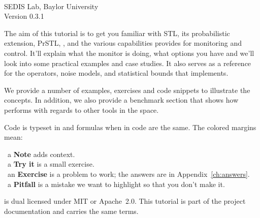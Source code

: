 \thispagestyle{empty}

\vspace*{6.4cm}

\vfill
{}\\[2pt]
{\sffamily\color{faint} SEDIS Lab, Baylor University}\\[10pt]
{\sffamily\color{faint} Version 0.3.1}

\clearpage
\thispagestyle{empty}
\noindent\rule{0pt}{1pt}
\vfill
{}

\medskip
\noindent The aim of this tutorial is to get you familiar with STL, its probabilistic extension, PrSTL, \sentil{}, and the various capabilities \sentil{} provides for monitoring and control. It'll explain what the monitor is doing, what options you have and we'll look into some practical examples and case studies. It also serves as a reference for the operators, noise models, and statistical bounds that \sentil{} implements.

\medskip
\noindent We provide a number of examples, exercises and code snippets to illustrate the concepts. In addition, we also provide a benchmark section that shows how \sentil{} performs with regards to other tools in the space.

\medskip
{}

\medskip
\noindent Code is typeset in  and formulas when in code are the same. The colored margins mean:

\smallskip
\noindent{\color{sentilblue}\rule{2.2pt}{9pt}}~a \textbf{Note} adds context.\\
\noindent{\color{trygreen}\rule{2.2pt}{9pt}}~a \textbf{Try it} is a small exercise.\\
\noindent{\color{okpurple}\rule{2.2pt}{9pt}}~an \textbf{Exercise} is a problem to work; the answers are in Appendix~\ref{ch:answers}.\\
\noindent{\color{vermillion}\rule{2.2pt}{9pt}}~a \textbf{Pitfall} is a mistake we want to highlight so that you don't make it.

\medskip
{}

\medskip
\noindent \sentil{} is dual licensed under MIT or Apache~2.0. This tutorial is part of the project documentation and carries the same terms.
\clearpage